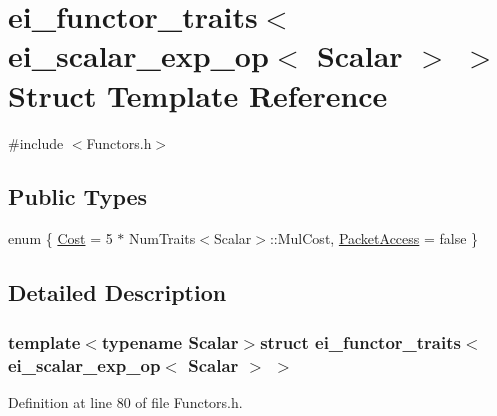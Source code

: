 \hypertarget{structei__functor__traits_3_01ei__scalar__exp__op_3_01_scalar_01_4_01_4}{\section{ei\-\_\-functor\-\_\-traits$<$ ei\-\_\-scalar\-\_\-exp\-\_\-op$<$ Scalar $>$ $>$ Struct Template Reference}
\label{structei__functor__traits_3_01ei__scalar__exp__op_3_01_scalar_01_4_01_4}
}


{\ttfamily \#include $<$Functors.\-h$>$}

\subsection*{Public Types}
\begin{DoxyCompactItemize}
\item 
enum \{ \hyperlink{structei__functor__traits_3_01ei__scalar__exp__op_3_01_scalar_01_4_01_4_a73cbedb02da2cf300cfb0b5a5c74572fae7343c3283c45d2a710eb03390d8fa65}{Cost} = 5 $\ast$ Num\-Traits$<$Scalar$>$\-:\-:Mul\-Cost, 
\hyperlink{structei__functor__traits_3_01ei__scalar__exp__op_3_01_scalar_01_4_01_4_a73cbedb02da2cf300cfb0b5a5c74572fab9002e7f86d21a0085afb44fd2d97a5e}{Packet\-Access} = false
 \}
\end{DoxyCompactItemize}


\subsection{Detailed Description}
\subsubsection*{template$<$typename Scalar$>$struct ei\-\_\-functor\-\_\-traits$<$ ei\-\_\-scalar\-\_\-exp\-\_\-op$<$ Scalar $>$ $>$}



Definition at line 80 of file Functors.\-h.



